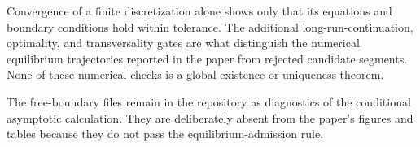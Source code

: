 Convergence of a finite discretization alone shows only that its equations and
boundary conditions hold within tolerance. The additional long-run-continuation, optimality, and
transversality gates are what distinguish the numerical equilibrium
trajectories reported in the paper from rejected candidate segments. None of
these numerical checks is a global existence or uniqueness theorem.

The free-boundary files remain in the repository as diagnostics of the
conditional asymptotic calculation. They are deliberately absent from the
paper's figures and tables because they do not pass the equilibrium-admission
rule.
